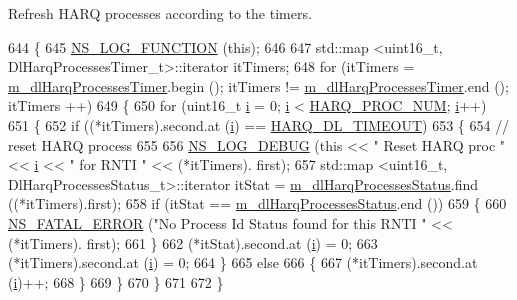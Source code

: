 Refresh H\+A\+RQ processes according to the timers. 


\begin{DoxyCode}
644 \{
645   \hyperlink{log-macros-disabled_8h_a90b90d5bad1f39cb1b64923ea94c0761}{NS\_LOG\_FUNCTION} (\textcolor{keyword}{this});
646 
647   std::map <uint16\_t, DlHarqProcessesTimer\_t>::iterator itTimers;
648   \textcolor{keywordflow}{for} (itTimers = \hyperlink{classns3_1_1PssFfMacScheduler_afcae17e3f08b0a6f1e1458a39da8cdcb}{m\_dlHarqProcessesTimer}.begin (); itTimers != 
      \hyperlink{classns3_1_1PssFfMacScheduler_afcae17e3f08b0a6f1e1458a39da8cdcb}{m\_dlHarqProcessesTimer}.end (); itTimers ++)
649     \{
650       \textcolor{keywordflow}{for} (uint16\_t \hyperlink{bernuolliDistribution_8m_a6f6ccfcf58b31cb6412107d9d5281426}{i} = 0; \hyperlink{bernuolliDistribution_8m_a6f6ccfcf58b31cb6412107d9d5281426}{i} < \hyperlink{cqa-ff-mac-scheduler_8h_a9185d8d7d2b2979181d4a7044a3d3555}{HARQ\_PROC\_NUM}; \hyperlink{bernuolliDistribution_8m_a6f6ccfcf58b31cb6412107d9d5281426}{i}++)
651         \{
652           \textcolor{keywordflow}{if} ((*itTimers).second.at (\hyperlink{bernuolliDistribution_8m_a6f6ccfcf58b31cb6412107d9d5281426}{i}) == \hyperlink{cqa-ff-mac-scheduler_8h_add9e0c4889dc1b5b25686480b31ad166}{HARQ\_DL\_TIMEOUT})
653             \{
654               \textcolor{comment}{// reset HARQ process}
655               
656               \hyperlink{group__logging_ga413f1886406d49f59a6a0a89b77b4d0a}{NS\_LOG\_DEBUG} (\textcolor{keyword}{this} << \textcolor{stringliteral}{" Reset HARQ proc "} << \hyperlink{bernuolliDistribution_8m_a6f6ccfcf58b31cb6412107d9d5281426}{i} << \textcolor{stringliteral}{" for RNTI "} << (*itTimers).
      first);
657               std::map <uint16\_t, DlHarqProcessesStatus\_t>::iterator itStat = 
      \hyperlink{classns3_1_1PssFfMacScheduler_aaddeb3fa864cb82b5829d4ca1cf9abea}{m\_dlHarqProcessesStatus}.find ((*itTimers).first);
658               \textcolor{keywordflow}{if} (itStat == \hyperlink{classns3_1_1PssFfMacScheduler_aaddeb3fa864cb82b5829d4ca1cf9abea}{m\_dlHarqProcessesStatus}.end ())
659                 \{
660                   \hyperlink{group__fatal_ga5131d5e3f75d7d4cbfd706ac456fdc85}{NS\_FATAL\_ERROR} (\textcolor{stringliteral}{"No Process Id Status found for this RNTI "} << (*itTimers).
      first);
661                 \}
662               (*itStat).second.at (\hyperlink{bernuolliDistribution_8m_a6f6ccfcf58b31cb6412107d9d5281426}{i}) = 0;
663               (*itTimers).second.at (\hyperlink{bernuolliDistribution_8m_a6f6ccfcf58b31cb6412107d9d5281426}{i}) = 0;
664             \}
665           \textcolor{keywordflow}{else}
666             \{
667               (*itTimers).second.at (\hyperlink{bernuolliDistribution_8m_a6f6ccfcf58b31cb6412107d9d5281426}{i})++;
668             \}
669         \}
670     \}
671   
672 \}
\end{DoxyCode}


